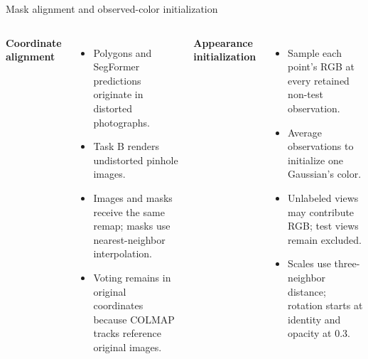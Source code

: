 \documentclass[aspectratio=169,10pt]{beamer}
\begin{document}
\begin{frame}{Mask alignment and observed-color initialization}
\begin{columns}[T,onlytextwidth]
\textbf{Coordinate alignment}
\begin{itemize}\tightitems
\item Polygons and SegFormer predictions originate in distorted photographs.
\item Task B renders undistorted pinhole images.
\item Images and masks receive the same remap; masks use nearest-neighbor interpolation.
\item Voting remains in original coordinates because COLMAP tracks reference original images.
\end{itemize}
\textbf{Appearance initialization}
\begin{itemize}\tightitems
\item Sample each point's RGB at every retained non-test observation.
\item Average observations to initialize one Gaussian's color.
\item Unlabeled views may contribute RGB; test views remain excluded.
\item Scales use three-neighbor distance; rotation starts at identity and opacity at 0.3.
\end{itemize}\end{columns}
\end{frame}
\end{document}
